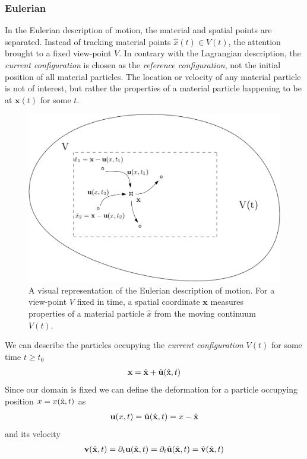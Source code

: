 \subsubsection*{Eulerian}
In the Eulerian description of motion, the material and spatial points are separated. Instead of tracking material points $\hat{x}(t) \in V(t)$, the attention brought to a fixed view-point $V$. In contrary with the Lagrangian description, the \textit{current configuration} is chosen as the \textit{reference configuration}, not the initial position of all material particles. The location or velocity of any material particle is not of interest, but rather the properties of a material particle happening to be at $\mathbf{x}(t)$ for some $t$. 
\begin{figure}[h!]
  \centering
    \includegraphics[scale=0.3]{./Fig/eulerian.png}
      \caption{A visual representation of the Eulerian description of motion. For a view-point $V$ fixed in time, a spatial coordinate $\mathbf{x}$ measures properties of a material particle $\hat{x}$ from the moving continuum $V(t)$.}
\end{figure} 
\newpage
We can describe the particles occupying the \textit{current configuration} $V(t)$ for some time $t \geq t_0$ 
\begin{align*}
\mathbf{x} = \hat{\mathbf{x}} + \hat{\mathbf{u}}(\text{\^{x}}, t)       
\end{align*}
Since our domain is fixed we can define the deformation for a particle 
occupying position $x = x(\text{\^{x}},t)$ as
\begin{align*}
\textbf{u}(x, t) = \hat{\mathbf{u}}(\hat{\mathbf{x}}, t) = x - \hat{\mathbf{x}}    \\
\end{align*}
and its velocity
\begin{align*}
\textbf{v}(\hat{\mathbf{x}},t) = \partial_t \mathbf{u}(\hat{\mathbf{x}},t) = \partial_t \hat{\mathbf{u}}(\hat{\mathbf{x}},t) = \hat{\mathbf{v}}(\hat{\mathbf{x}},t)
\end{align*}
